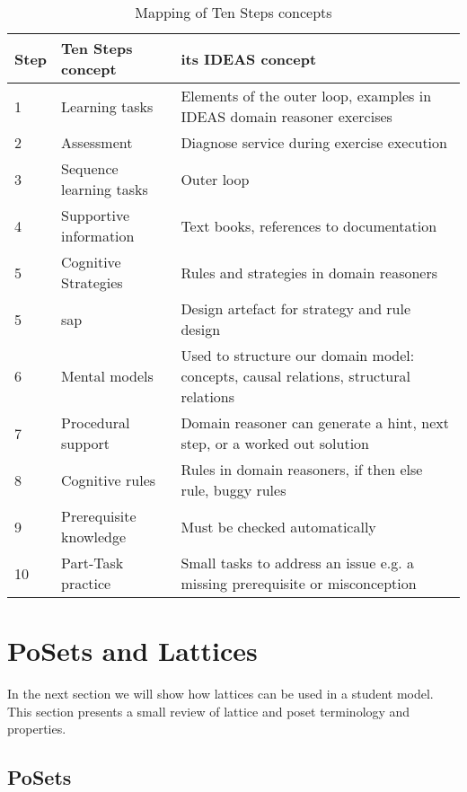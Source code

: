 \begin{table}[H]
\begin{tabular}{| p{5mm} |p{5cm}| p{8cm}|}
\hline
Step &Ten Steps concept & \gls{its} IDEAS concept \\
\hline
1 & Learning tasks      & Elements of the outer loop, \newline examples in IDEAS domain reasoner exercises     \\
2 & Assessment  & Diagnose service during exercise execution \\
3 & Sequence learning tasks & Outer loop \\
4 & Supportive information & Text books, references to documentation\\
5 & Cognitive Strategies & Rules and strategies in domain reasoners\\
5 & \gls{sap} & Design artefact for strategy and rule design\\
6 & Mental models & Used to structure our domain model: concepts, causal relations, structural relations\\
7 & Procedural support & Domain reasoner can generate a hint, next step, or a worked out solution\\
8 & Cognitive rules & Rules in domain reasoners, if then else rule, buggy rules\\
9 & Prerequisite knowledge & Must be checked automatically\\
10 & Part-Task practice & Small tasks to address an issue e.g. a missing prerequisite or misconception\\

\hline
\end{tabular}
\caption{Mapping of Ten Steps concepts}
\label{map.tems}
\end{table}







\section{PoSets and Lattices}
\label{sec:lattices}

In the next section we will show how lattices can be used in a student model.
This section presents a small review of lattice and poset terminology and properties.


\subsection{PoSets}


